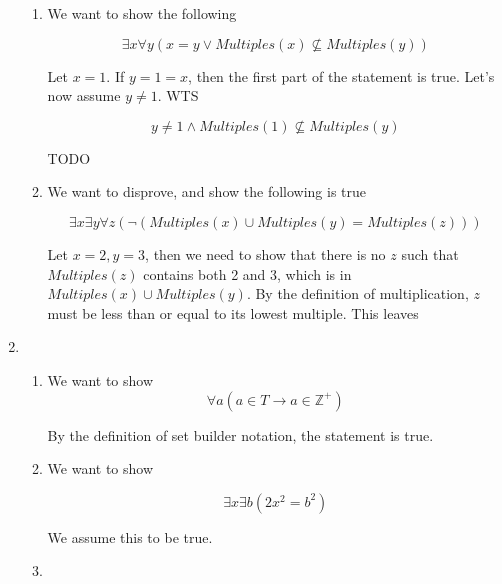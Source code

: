 \documentclass{article}
\newcommand{\Z}{\mathbb{Z}}
\newcommand{\mult}{\textit{Multiples}}
\begin{document}
\begin{enumerate}
\begin{enumerate}
		      \item We want to show the following

		            $$
			            \exists x \forall y (x = y \lor \textit{Multiples}(x)
			            \not\subseteq \textit{Multiples}(y))
		            $$

		            Let $x = 1$. If $y = 1 = x$, then the first part of the statement is true. Let's
		            now assume $y \ne 1$. WTS

		            $$
			            y \ne 1 \land
			            \textit{Multiples}(1)
			            \not\subseteq \textit{Multiples}(y)
		            $$

		            TODO

		      \item We want to disprove, and show the following is true

		            $$
			            \exists x \exists y \forall z (\lnot (\mult(x) \cup \mult(y) = \mult(z)))
		            $$

		            Let $x=2, y=3$, then we need to show that there is no $z$ such that $\mult(z)$
		            contains both 2 and 3, which is in $\mult(x) \cup \mult(y)$. By the definition
		            of multiplication, $z$ must be less than or equal to its lowest multiple. This leaves

	      \end{enumerate}

	\item \begin{enumerate}[i]
		      \item  We want to show
		            $$
			            \forall a (a \in T \to a \in \Z^+)
		            $$

		            By the definition of set builder notation, the statement is true.

		      \item We want to show

		            $$
			            \exists x \exists b (2x^2 = b^2)
		            $$

		            We assume this to be true.

		      \item

	      \end{enumerate}
\end{enumerate}
\end{document}
